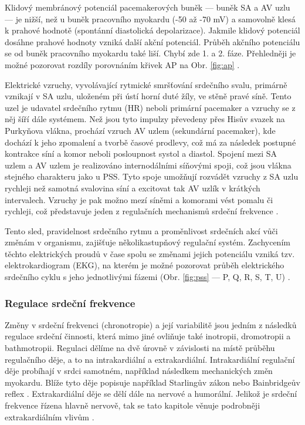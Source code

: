 Klidový membránový potenciál pacemakerových buněk --- buněk SA a AV uzlu --- je
nižší, než u buněk pracovního myokardu (-50 až -70 mV) a samovolně klesá k
prahové hodnotě (spontánní diastolická depolarizace). Jakmile klidový potenciál
dosáhne prahové hodnoty vzniká další akční potenciál. Průběh akčního potenciálu
se od buněk pracovního myokardu také liší. Chybí zde 1. a 2. fáze. Přehledněji
je možné pozorovat rozdíly porovnáním křivek AP na Obr. \ref{fig:ap}
\cite{Petrek2019}.

Elektrické vzruchy, vyvolávající rytmické smršťování srdečního svalu, primárně
vznikají v SA uzlu, uloženém při ústí horní duté žíly, ve stěně pravé síně.
Tento uzel je udavatel srdečního rytmu (HR) neboli primární pacemaker a vzruchy se z
něj šíří dále systémem. Než jsou tyto impulzy převedeny přes Hisův svazek na
Purkyňova vlákna, prochází vzruch AV uzlem (sekundární pacemaker), kde dochází k
jeho zpomalení a tvorbě časové prodlevy, což má za následek postupné kontrakce
síní a komor neboli posloupnost systol a diastol. Spojení mezi SA uzlem a AV
uzlem je realizováno internodálními síňovými spoji, což jsou vlákna stejného
charakteru jako u PSS. Tyto spoje umožňují rozvádět vzruchy z SA uzlu rychleji
než samotná svalovina síní a excitovat tak AV uzlík v krátkých intervalech.
Vzruchy je pak možno mezí síněmi a komorami vést pomalu či rychleji, což
představuje jeden z regulačních mechanismů srdeční frekvence
\cite{Dylevsky2013,Cihak2016}.

Tento sled, pravidelnost srdečního rytmu a proměnlivost srdečních akcí vůči
změnám v organismu, zajišťuje několikastupňový regulační systém. Zachycením
těchto elektrických proudů v čase spolu se změnami jejich potenciálu vzniká tzv.
elektrokardiogram (EKG), na kterém je možné pozorovat průběh elektrického
srdečního cyklu s jeho jednotlivými fázemi (Obr. \ref{fig:pss} --- P, Q, R, S,
T, U) \cite{Dylevsky2013,Cihak2016}.


\subsubsection{Regulace srdeční frekvence}
\label{section:hr_regulation}
Změny v srdeční frekvenci (chronotropie) a její variabilitě jsou jedním z
následků regulace srdeční činnosti, která mimo jiné ovliňuje také inotropii,
dromotropii a bathmotropii. Regulaci dělíme na dvě úrovně v závislosti na místě
průběhu regulačního děje, a to na intrakardiální a extrakardiální.
Intrakardiální regulační děje probíhají v srdci samotném, například následkem
mechanických změn myokardu. Blíže tyto děje popisuje například Starlingův zákon
nebo Bainbridgeův reflex \cite{Kittnar2020}. Extrakardiální děje se dělí dále na
nervové a humorální. Jelikož je srdeční frekvence řízena hlavně nervově, tak se
tato kapitole věnuje podrobněji extrakardiálním vlivům \cite{Orel2019}.

